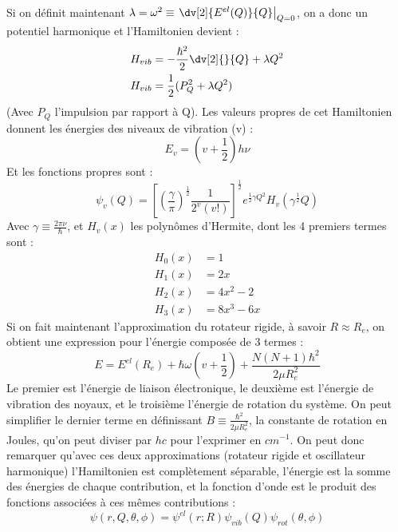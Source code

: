 Si on définit maintenant $\lambda = \omega^2 \equiv \left. \dv[2]{E^{el}(Q)}{Q}\right|_{Q = 0} $, on a donc un potentiel harmonique et l'Hamiltonien devient :
\begin{align*}
    H_{vib} &= -\frac{\hbar^2}{2}\dv[2]{}{Q} +\lambda Q^2\\
    H_{vib} &= \frac{1}{2}(P^2_Q + \lambda Q^2)
\end{align*}
(Avec $P_Q$ l'impulsion par rapport à Q).\newline
Les valeurs propres de cet Hamiltonien donnent les énergies des niveaux de vibration (v) :
\begin{equation*}
    E_v = (v + \frac{1}{2})h\nu
\end{equation*}
Et les fonctions propres sont : 
\begin{equation*}
    \psi_v(Q) = \left[(\frac{\gamma}{\pi})^{\frac{1}{2}}\frac{1}{2^v(v!)} \right]^{\frac{1}{2}}e^{\frac{1}{2}\gamma Q^2}H_v(\gamma^{\frac{1}{2}}Q)
\end{equation*}
Avec $\gamma \equiv \frac{2\pi \nu}{\hbar}$, et $H_v(x)$ les polynômes d'Hermite, dont les 4 premiers termes sont : 
\begin{equation*}
    \begin{split}
        H_0(x) &= 1\\
        H_1(x) &= 2x\\
        H_2(x) &= 4x^2-2\\
        H_3(x) &= 8x^3-6x        
    \end{split}
\end{equation*}
Si on fait maintenant l'approximation du rotateur rigide, à savoir $R\approx R_e$, on obtient une expression pour l'énergie composée de 3 termes : 
\begin{equation*}
    E = E^{el}(R_e) + \hbar\omega(v+\frac{1}{2}) + \frac{N(N+1)\hbar^2}{2\mu R_e^2}
\end{equation*}
Le premier est l'énergie de liaison électronique, le deuxième est l'énergie de vibration des noyaux, et le troisième l'énergie de rotation du système. On peut simplifier le dernier terme en définissant $B \equiv \frac{\hbar^2}{2\mu R_e^2}$, la constante de rotation en Joules, qu'on peut diviser par $hc$ pour l'exprimer en $cm^{-1}$.\newline
On peut donc remarquer qu'avec ces deux approximations (rotateur rigide et oscillateur harmonique) l'Hamiltonien est complètement séparable, l'énergie est la somme des énergies de chaque contribution, et la fonction d'onde est le produit des fonctions associées à ces mêmes contributions : 
\begin{equation*}
    \psi(r,Q,\theta,\phi) = \psi^{el}(r;R)\psi_{vib}(Q)\psi_{rot}(\theta,\phi)
\end{equation*}

